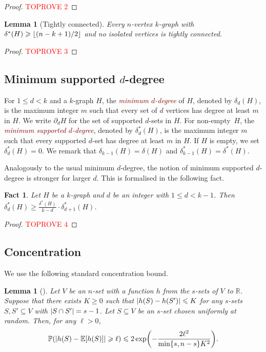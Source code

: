 \documentclass[12pt,reqno]{amsart}
\theoremstyle{plain}
\newtheorem{lemma}[theorem]{Lemma}
\newtheorem{fact}[theorem]{Fact}
\theoremstyle{definition}
\numberwithin{equation}{section}
\newcommand{\Prob}{\mathbb{P}}
\newcommand{\Exp}{\mathbb{E}}
\DeclarePairedDelimiter{\abs}{\lvert}{\rvert}
\DeclarePairedDelimiter{\floor}{\lfloor}{\rfloor}
\DeclarePairedDelimiter{\set}{\{}{\}}
\renewcommand{\ge}{\geqslant}
\renewcommand{\le}{\leqslant}
\renewcommand{\geq}{\geqslant}
\renewcommand{\leq}{\leqslant}
\renewcommand{\subset}{\subseteq}
\newcommand{\defn}[1]{\textcolor{Maroon}{\emph{#1}}}
\newcommand{\comin}{\delta^{\ast}}
\newcommand{\bR}{\mathbb{R}}
\begin{document}
	\begin{proof}\textcolor{red}{TOPROVE 2}\end{proof}
	
	
	\begin{lemma}[Tightly connected]\label{lem:dirac-to-tightly-connected}
		Every $n$-vertex $k$-graph with $\comin(H) \geq \floor{(n - k + 1)/2}$ and no isolated vertices is tightly connected.
	\end{lemma}
	
	\begin{proof}\textcolor{red}{TOPROVE 3}\end{proof}
	
	\subsection{Minimum supported \texorpdfstring{$d$}{d}-degree}
	
	For $1 \leq d < k$ and a $k$-graph $H$, the \defn{minimum $d$-degree} of $H$, denoted by $\delta_d(H)$, is the maximum integer $m$ such that every set of $d$ vertices has degree at least $m$ in $H$.
	We write $\partial_d H$ for the set of supported $d$-sets in $H$.
	For non-empty~$H$, the \defn{minimum supported $d$-degree}, denoted by $\comin_d(H)$, is the maximum integer $m$ such that every supported $d$-set has degree at least $m$ in $H$.
	If $H$ is empty, we set $\comin_d(H)=0$.
	We remark that $\delta_{k - 1}(H) = \delta(H)$ and $\comin_{k - 1}(H)=\comin(H)$.
	
	Analogously to the usual minimum $d$-degree, the notion of minimum supported $d$-degree is stronger for larger $d$.
	This is formalised in the following fact.
	
	\begin{fact}\label{claim:supported_minimum_degree}
		Let $H$ be a $k$-graph and $d$ be an integer with $1 \le d < k - 1$.
		Then $\comin_d(H) \ge \frac{\comin(H)}{k-d} \cdot \comin_{d+1}(H)$.
	\end{fact}
	
	\begin{proof}\textcolor{red}{TOPROVE 4}\end{proof}
	
	\subsection{Concentration}
	
	We use the following standard concentration bound.
	\begin{lemma}[{\cite[Cor.~2.2]{concentration}}]\label{lem:concentration}
		Let $V$ be an $n$-set with a function $h$ from the $s$-sets of $V$ to $\bR$.
		Suppose that there exists $K \geq 0$ such that $\abs{h(S)-h(S')} \le K$ for any $s$-sets $S, S' \subset V$ with $\abs{S \cap S'} = s-1$.
		Let $S \subset V$ be an $s$-set chosen uniformly at random.
		Then, for any $\ell >0$,
		\begin{equation*}
			\Prob(\abs{h(S) - \Exp [h(S)]} \geq \ell) \leq 2 \exp\biggl(-\frac{2 \ell^2}{\min\set{s, n-s} K^2}\biggr).
		\end{equation*}
	\end{lemma}
	
\end{document}
